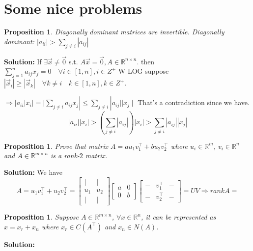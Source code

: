 \documentclass[14pt]{article}
\newtheorem{proposition}[theorem]{Proposition}
\theoremstyle{definition}
\newenvironment{solution}
{\color{C2}\begin{framed}\begingroup\textbf{Solution:} }
  {\endgroup\end{framed}}
\theoremstyle{remark}
\begin{document}
\section{Some nice problems}
\begin{proposition}
    Diagonally dominant matrices are invertible.
    Diagonally dominant: $\left|a_{i i}\right|>\sum_{j \neq i}\left|a_{i j}\right|$
\end{proposition}
\begin{solution}
    If $\exists \vec{x} \neq \overrightarrow{0}$ s.t. $A \vec{x}=\overrightarrow{0}, A \in \mathbb{R}^{n \times n}$.
    then $\sum_{j=1}^n a_{i j} x_j=0 \quad \forall i \in[1, n], i \in Z^{+}$
    W LOG suppose $\left|\vec{x}_i\right| \ge\left|\vec{x}_k\right| \quad \forall k \neq i \quad k \in[1, n], k \in Z^{+}$.

    $\Rightarrow\left|a_{i i}\right| x_i|=| \sum_{j \neq i} a_{i j} x_j\left|\leqslant \sum_{j \neq i}\right| a_{i j}|| x_j \mid$
    That's a contradiction since we have.
    $$
        \left|a_{ii}\right|\left|x_i\right|>\left(\sum_{j\ne i}\left|a_{i j}\right|\right)\left|x_i\right|>\sum_{j \neq i}\left|a_{i j}\right|\left|x_j\right|
    $$
\end{solution}


\begin{proposition}
    Prove that matrix $A = au_1v_1^\top + bu_2v_2^\top$ where $u_i\in\mathbb{R}^m$, $v_i\in\mathbb{R}^n$ and $A\in\mathbb{R}^{m\times n}$ is a rank-$2$ matrix.
\end{proposition}
\begin{solution}
    We have
    \[
        A = u_1v_1^\top + u_2v_2^\top = \begin{bmatrix}
            |   & |   \\
            u_1 & u_2 \\
            |   & |
        \end{bmatrix}\begin{bmatrix}
            a & 0 \\
            0 & b
        \end{bmatrix}\begin{bmatrix}
            - & v_1^\top & - \\
            - & v_2^\top & -
        \end{bmatrix} = UV \Longrightarrow rank A =
    \]

\end{solution}

\begin{proposition}
    Suppose $A\in \mathbb{R}^{m\times n}$, $\forall x\in \mathbb{R}^n$, it can be represented as $x = x_r + x_n$ where $x_r \in C(A^\top)$ and $x_n \in N(A)$.
\end{proposition}
\begin{solution}

\end{solution}
\end{document}
